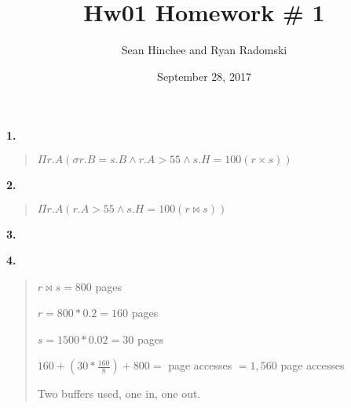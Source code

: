 \documentclass{article}
\title{Hw01}
\author{Sean Hinchee and Ryan Radomski}
\begin{document}

\title{
Homework \# 1 \\}
\date{September 28, 2017}
\maketitle

\textbf{1.}
\begin{quote}
$\Pi r.A (\sigma r.B = s.B \land r.A > 55 \land s.H = 100(r \times s))$

\end{quote}

\textbf{2.}
\begin{quote}
$\Pi r.A (r.A > 55 \land s.H = 100(r \bowtie s))$

\end{quote}

\textbf{3.}
\begin{quote}
\end{quote}

\textbf{4.}
\begin{quote}

$r \bowtie s = 800$ pages

$r = 800 * 0.2 = 160$ pages

$s = 1500 * 0.02 = 30$ pages

$ 160 + (30 * \frac{160}{8}) + 800 = $ page accesses $= 1,560$ page accesses

Two buffers used, one in, one out.

\end{quote}
\end{document}
